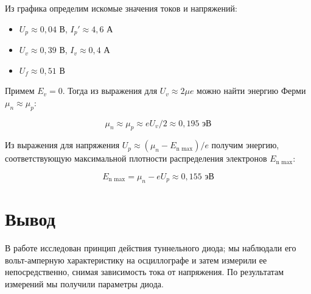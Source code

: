 \documentclass[12pt]{kiarticle}
\begin{document}
	Из графика определим искомые значения токов и напряжений:
	
	\begin{itemize}
		\item $ U_p \approx 0,04 $ В, $ I_p' \approx 4,6 $ А
		\item $ U_v \approx 0,39 $ В, $ I_v \approx 0,4 $ А
		\item $ U_f \approx 0,51 $ В
	\end{itemize} 

Примем $E_v = 0$. Тогда из выражения для $U_v \approx 2\mu e$ можно найти энергию Ферми $\mu_n \approx \mu_p$:

\[ \mu_n \approx \mu_p \approx eU_v/2 \approx 0,195 \text{ эВ} \]

Из выражения для напряжения $U_p \approx (\mu_n - E_\text{n max})/e$ получим энергию, соответствующую максимальной плотности распределения электронов $E_\text{n max}$:

\[ E_\text{n max} = \mu_n - eU_p \approx 0,155 \text{ эВ} \]
	
	\section{Вывод} 
	В работе исследован принцип действия туннельного диода; мы наблюдали его вольт-амперную характеристику на осциллографе и затем измерили ее непосредственно, снимая зависимость тока от напряжения. По результатам измерений мы получили параметры диода.
	
\end{document}
